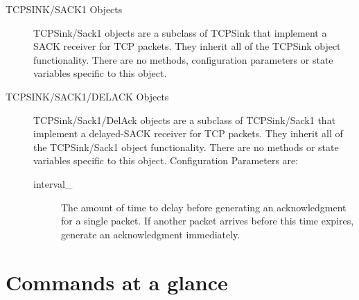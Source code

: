 \begin{description}
\item[TCPSINK/SACK1 Objects]
TCPSink/Sack1 objects are a subclass of TCPSink that implement a SACK
receiver for TCP packets. They inherit all of the TCPSink object
functionality. There are no methods, configuration parameters or state
variables specific to this object. 


\item[TCPSINK/SACK1/DELACK Objects]
TCPSink/Sack1/DelAck objects are a subclass of TCPSink/Sack1 that
implement a delayed-SACK receiver for TCP packets. They inherit all of the
TCPSink/Sack1 object functionality. There are no methods or state
variables specific to this object. 
Configuration Parameters are:
\begin{description}

\item[interval\_]
The amount of time to delay before generating an acknowledgment for a
single packet. If another packet arrives before this time expires,
generate an acknowledgment immediately. 
\end{description}
\end{description}



\section{Commands at a glance}
\label{sec:agentscommand}

